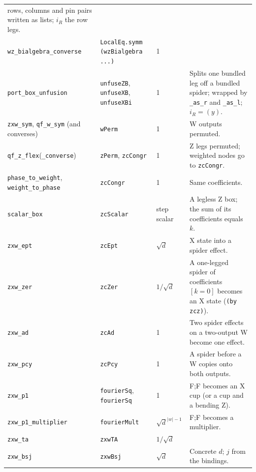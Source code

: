 {\begin{xltabular}{\linewidth}{@{}p{4.3cm}p{3.6cm}p{2.2cm}X@{}}
  rows, columns and pin pairs written as lists; $i_R$ the row legs. \\
\texttt{wz\_\allowbreak{}bialgebra\_\allowbreak{}converse} & \texttt{LocalEq.symm\textquotesingle{} (wzBialgebra ...)} & 1 & \\
\texttt{port\_\allowbreak{}box\_\allowbreak{}unfusion} & \texttt{unfuseZB}, \texttt{unfuseXB}, \texttt{unfuseXBi} & 1 & Splits one
  bundled leg off a bundled spider; wrapped by \texttt{\_\allowbreak{}as\_\allowbreak{}r} and \texttt{\_\allowbreak{}as\_\allowbreak{}l}; $i_R=(y)$. \\
\texttt{zxw\_\allowbreak{}sym}, \texttt{qf\_\allowbreak{}w\_\allowbreak{}sym} (and converses) & \texttt{wPerm} & 1 & W outputs permuted. \\
\texttt{qf\_\allowbreak{}z\_\allowbreak{}flex}(\texttt{\_\allowbreak{}converse}) & \texttt{zPerm}, \texttt{zcCongr} & 1 & Z legs permuted;
  weighted nodes go to \texttt{zcCongr}. \\
\texttt{phase\_\allowbreak{}to\_\allowbreak{}weight}, \texttt{weight\_\allowbreak{}to\_\allowbreak{}phase} & \texttt{zcCongr} & 1 & Same coefficients. \\
\texttt{scalar\_\allowbreak{}box} & \texttt{zcScalar} & step scalar & A legless Z box; the sum of its coefficients
  equals $k$. \\
\texttt{zxw\_\allowbreak{}ept} & \texttt{zcEpt} & $\sqrt d$ & X state into a spider effect. \\
\texttt{zxw\_\allowbreak{}zer} & \texttt{zcZer} & $1/\sqrt d$ & A one-legged spider of coefficients $[k=0]$ becomes
  an X state (\texttt{(by zcz)}). \\
\texttt{zxw\_\allowbreak{}ad} & \texttt{zcAd} & 1 & Two spider effects on a two-output W become one effect. \\
\texttt{zxw\_\allowbreak{}pcy} & \texttt{zcPcy} & 1 & A spider before a W copies onto both outputs. \\
\texttt{zxw\_\allowbreak{}p1} & \texttt{fourierSq\textquotesingle{}}, \texttt{fourierSq} & 1 & F;F becomes an X cup (or a cup and a
  bending Z). \\
\texttt{zxw\_\allowbreak{}p1\_\allowbreak{}multiplier} & \texttt{fourierMult} & $\sqrt d^{|w|-1}$ & F;F becomes a multiplier. \\
\texttt{zxw\_\allowbreak{}ta} & \texttt{zxwTA} & $1/\sqrt d$ & \\
\texttt{zxw\_\allowbreak{}bsj} & \texttt{zxwBsj} & $\sqrt d$ & Concrete $d$; $j$ from the bindings. \\

\end{xltabular}}
